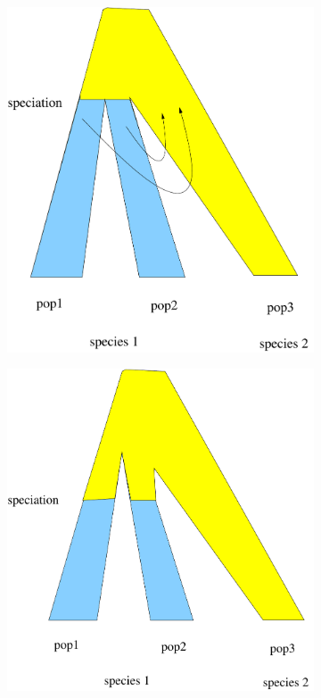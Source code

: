 \begin{figure}[htbp!]

  \begin{subfigure}{0.5\textwidth}
    \includegraphics[width=\textwidth]{popmerge.pdf}
    \caption{}
    \label{fig:2}
  \end{subfigure}
  \begin{subfigure}{0.5\textwidth}
    \includegraphics[width=\textwidth]{popmerge2.pdf}

\end{subfigure}
\end{figure}
